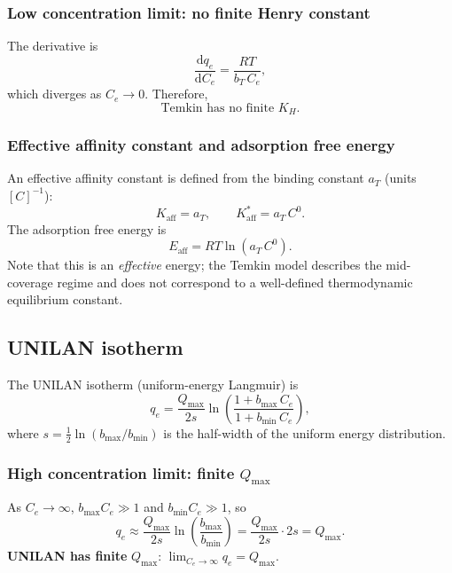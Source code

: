\documentclass[journal=jacsat,manuscript=article]{achemso}
\begin{document}
\subsubsection{Low concentration limit: no finite Henry constant}

The derivative is
\begin{equation}
	\frac{\mathrm{d}q_e}{\mathrm{d}C_e} = \frac{RT}{b_T\, C_e},
\end{equation}
which diverges as $C_e \to 0$. Therefore,
\begin{equation}
	\boxed{\text{Temkin has no finite } K_H.}
\end{equation}

\subsubsection{Effective affinity constant and adsorption free energy}

An effective affinity constant is defined from the binding constant $a_T$ (units $[C]^{-1}$):
\begin{equation}
	K_{\mathrm{aff}} = a_T,
	\qquad
	K_{\mathrm{aff}}^{\ast} = a_T\, C^0.
\end{equation}
The adsorption free energy is
\begin{equation}
	\boxed{
		E_{\mathrm{aff}} = RT\ln(a_T\, C^0).
	}
\end{equation}
Note that this is an \emph{effective} energy; the Temkin model describes the mid-coverage regime and does not correspond to a well-defined thermodynamic equilibrium constant.

\subsection{UNILAN isotherm}
\label{sec:si_unilan}

The UNILAN isotherm (uniform-energy Langmuir) is
\begin{equation}
	q_e = \frac{Q_{\max}}{2s}
	\ln\!\left(
	\frac{1 + b_{\max}\, C_e}{1 + b_{\min}\, C_e}
	\right),
	\label{eq:si_unilan}
\end{equation}
where $s = \tfrac{1}{2}\ln(b_{\max}/b_{\min})$ is the half-width of the uniform energy distribution.

\subsubsection{High concentration limit: finite $Q_{\max}$}

As $C_e \to \infty$, $b_{\max}C_e \gg 1$ and $b_{\min}C_e \gg 1$, so
\begin{equation}
	q_e \approx \frac{Q_{\max}}{2s}
	\ln\!\left(\frac{b_{\max}}{b_{\min}}\right)
	= \frac{Q_{\max}}{2s} \cdot 2s = Q_{\max}.
\end{equation}
\textbf{UNILAN has finite }$Q_{\max}$:\quad
$\displaystyle \lim_{C_e \to \infty} q_e = Q_{\max}$.
\end{document}
